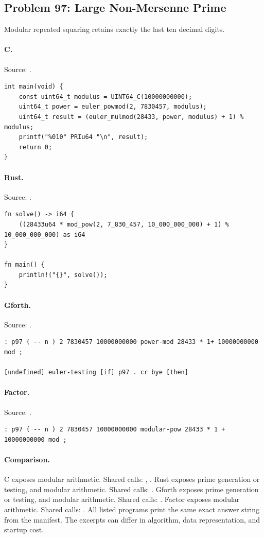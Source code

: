 \subsection{Problem 97: Large Non-Mersenne Prime}
\label{walkthrough:p97}
Modular repeated squaring retains exactly the last ten decimal digits.

\paragraph{C.} Source: .
\begin{lstlisting}
int main(void) {
    const uint64_t modulus = UINT64_C(10000000000);
    uint64_t power = euler_powmod(2, 7830457, modulus);
    uint64_t result = (euler_mulmod(28433, power, modulus) + 1) % modulus;
    printf("%010" PRIu64 "\n", result);
    return 0;
}
\end{lstlisting}

\paragraph{Rust.} Source: .
\begin{lstlisting}
fn solve() -> i64 {
    ((28433u64 * mod_pow(2, 7_830_457, 10_000_000_000) + 1) % 10_000_000_000) as i64
}

fn main() {
    println!("{}", solve());
}
\end{lstlisting}

\paragraph{Gforth.} Source: .
\begin{lstlisting}
: p97 ( -- n ) 2 7830457 10000000000 power-mod 28433 * 1+ 10000000000 mod ;

[undefined] euler-testing [if] p97 . cr bye [then]
\end{lstlisting}

\paragraph{Factor.} Source: .
\begin{lstlisting}
: p97 ( -- n ) 2 7830457 10000000000 modular-pow 28433 * 1 + 10000000000 mod ;
\end{lstlisting}

\paragraph{Comparison.}
C exposes modular arithmetic. Shared calls: \texttt{}, \texttt{}. Rust exposes prime generation or testing, and modular arithmetic. Shared calls: \texttt{}. Gforth exposes prime generation or testing, and modular arithmetic. Shared calls: \texttt{}. Factor exposes modular arithmetic. Shared calls: \texttt{}.
All listed programs print the same exact answer string from the manifest. The excerpts can differ in algorithm, data representation, and startup cost.

